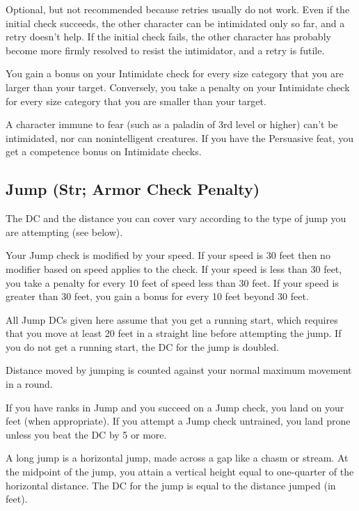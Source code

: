  Optional, but not recommended because retries usually do not work. Even if the initial check succeeds, the other character can be intimidated only so far, and a retry doesn't help. If the initial check fails, the other character has probably become more firmly resolved to resist the intimidator, and a retry is futile.

 You gain a  bonus on your Intimidate check for every size category that you are larger than your target. Conversely, you take a  penalty on your Intimidate check for every size category that you are smaller than your target.

\par A character immune to fear (such as a paladin of 3rd level or higher) can't be intimidated, nor can nonintelligent creatures. If you have the Persuasive feat, you get a  competence bonus on Intimidate checks.

\subsection{Jump (Str; Armor Check Penalty)}
 The DC and the distance you can cover vary according to the type of jump you are attempting (see below).

Your Jump check is modified by your speed. If your speed is 30 feet then no modifier based on speed applies to the check. If your speed is less than 30 feet, you take a  penalty for every 10 feet of speed less than 30 feet. If your speed is greater than 30 feet, you gain a  bonus for every 10 feet beyond 30 feet.

All Jump DCs given here assume that you get a running start, which requires that you move at least 20 feet in a straight line before attempting the jump. If you do not get a running start, the DC for the jump is doubled.

Distance moved by jumping is counted against your normal maximum movement in a round.

If you have ranks in Jump and you succeed on a Jump check, you land on your feet (when appropriate). If you attempt a Jump check untrained, you land prone unless you beat the DC by 5 or more.

 A long jump is a horizontal jump, made across a gap like a chasm or stream. At the midpoint of the jump, you attain a vertical height equal to one-quarter of the horizontal distance. The DC for the jump is equal to the distance jumped (in feet).

